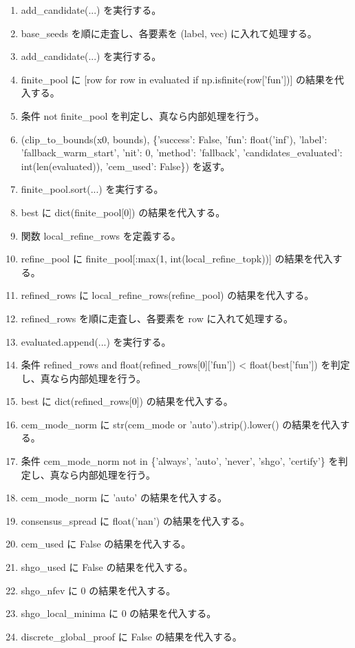 \documentclass[a4paper,11pt]{article}
\begin{document}
\begin{enumerate}[leftmargin=1.8em]
\item   add\_candidate(...) を実行する。
\item base\_seeds を順に走査し、各要素を (label, vec) に入れて処理する。
\item   add\_candidate(...) を実行する。
\item finite\_pool に [row for row in evaluated if np.isfinite(row['fun'])] の結果を代入する。
\item 条件 not finite\_pool を判定し、真なら内部処理を行う。
\item   (clip\_to\_bounds(x0, bounds), \{'success': False, 'fun': float('inf'), 'label': 'fallback\_warm\_start', 'nit': 0, 'method': 'fallback', 'candidates\_evaluated': int(len(evaluated)), 'cem\_used': False\}) を返す。
\item finite\_pool.sort(...) を実行する。
\item best に dict(finite\_pool[0]) の結果を代入する。
\item 関数 local\_refine\_rows を定義する。
\item refine\_pool に finite\_pool[:max(1, int(local\_refine\_topk))] の結果を代入する。
\item refined\_rows に local\_refine\_rows(refine\_pool) の結果を代入する。
\item refined\_rows を順に走査し、各要素を row に入れて処理する。
\item   evaluated.append(...) を実行する。
\item 条件 refined\_rows and float(refined\_rows[0]['fun']) < float(best['fun']) を判定し、真なら内部処理を行う。
\item   best に dict(refined\_rows[0]) の結果を代入する。
\item cem\_mode\_norm に str(cem\_mode or 'auto').strip().lower() の結果を代入する。
\item 条件 cem\_mode\_norm not in \{'always', 'auto', 'never', 'shgo', 'certify'\} を判定し、真なら内部処理を行う。
\item   cem\_mode\_norm に 'auto' の結果を代入する。
\item consensus\_spread に float('nan') の結果を代入する。
\item cem\_used に False の結果を代入する。
\item shgo\_used に False の結果を代入する。
\item shgo\_nfev に 0 の結果を代入する。
\item shgo\_local\_minima に 0 の結果を代入する。
\item discrete\_global\_proof に False の結果を代入する。

\end{enumerate}
\end{document}
